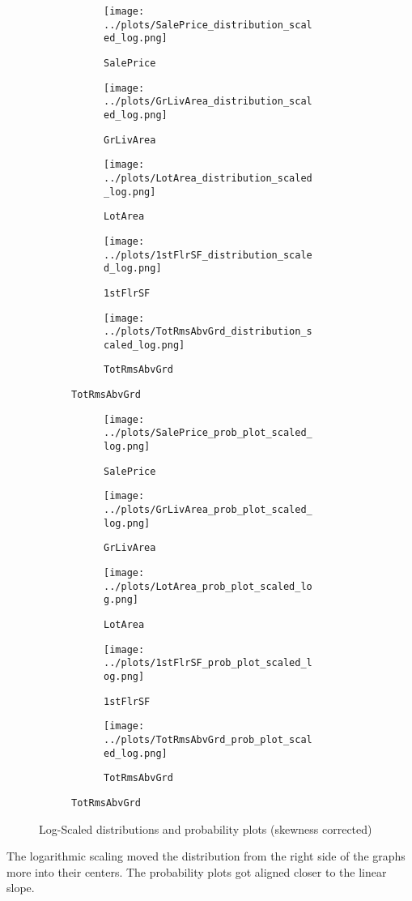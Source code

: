 \begin{figure}[h]
\begin{subfigure}{\textwidth}
    \centering
    \begin{subfigure}{.19\textwidth}
        \texttt{[image: ../plots/SalePrice\_distribution\_scaled\_log.png]}
        \caption{\texttt{SalePrice}}
    \end{subfigure}
    \begin{subfigure}{.19\textwidth}
        \texttt{[image: ../plots/GrLivArea\_distribution\_scaled\_log.png]}
        \caption{\texttt{GrLivArea}}
    \end{subfigure}
    \begin{subfigure}{.19\textwidth}
        \texttt{[image: ../plots/LotArea\_distribution\_scaled\_log.png]}
        \caption{\texttt{LotArea}}
    \end{subfigure}
    \begin{subfigure}{.19\textwidth}
        \texttt{[image: ../plots/1stFlrSF\_distribution\_scaled\_log.png]}
        \caption{\texttt{1stFlrSF}}
    \end{subfigure}
    \begin{subfigure}{.19\textwidth}
        \texttt{[image: ../plots/TotRmsAbvGrd\_distribution\_scaled\_log.png]}
        \caption{\texttt{TotRmsAbvGrd}}
    \end{subfigure}
\end{subfigure}
\begin{subfigure}{\textwidth}
    \centering
    \begin{subfigure}{.19\textwidth}
        \texttt{[image: ../plots/SalePrice\_prob\_plot\_scaled\_log.png]}
        \caption{\texttt{SalePrice}}
    \end{subfigure}
    \begin{subfigure}{.19\textwidth}
        \texttt{[image: ../plots/GrLivArea\_prob\_plot\_scaled\_log.png]}
        \caption{\texttt{GrLivArea}}
    \end{subfigure}
    \begin{subfigure}{.19\textwidth}
        \texttt{[image: ../plots/LotArea\_prob\_plot\_scaled\_log.png]}
        \caption{\texttt{LotArea}}
    \end{subfigure}
    \begin{subfigure}{.19\textwidth}
        \texttt{[image: ../plots/1stFlrSF\_prob\_plot\_scaled\_log.png]}
        \caption{\texttt{1stFlrSF}}
    \end{subfigure}
    \begin{subfigure}{.19\textwidth}
        \texttt{[image: ../plots/TotRmsAbvGrd\_prob\_plot\_scaled\_log.png]}
        \caption{\texttt{TotRmsAbvGrd}}
    \end{subfigure}
\end{subfigure}
\caption{Log-Scaled distributions and probability plots (skewness corrected)}
\label{fig:features_scaled_log}
\end{figure}

The logarithmic scaling moved the distribution from the right side of the graphs more into their centers. The probability plots got aligned closer to the linear slope.
